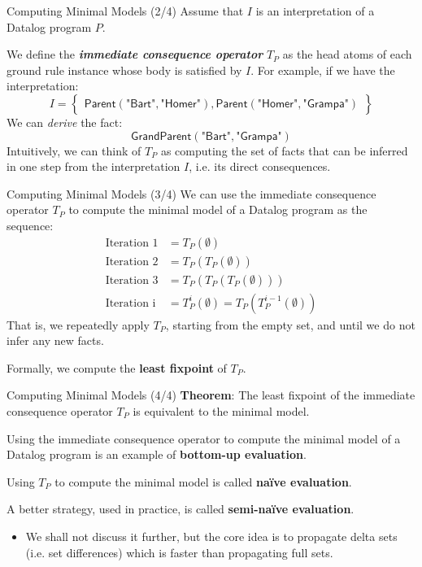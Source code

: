 \begin{frame}{Computing Minimal Models (2/4)}
Assume that $I$ is an interpretation of a Datalog program $P$.

We define the \textbf{\emph{immediate consequence operator}} $T_P$ as the head
atoms of each ground rule instance whose body is satisfied by $I$. For example, if we have the
interpretation:
$$
I = \left\{
\begin{array}{l}
\textsf{Parent}(\textsf{"Bart"}, \textsf{"Homer"}), \textsf{Parent}(\textsf{"Homer"}, \textsf{"Grampa"})
\end{array}\right\}
$$
We can \emph{derive} the fact:
$$
\textsf{GrandParent}(\textsf{"Bart"}, \textsf{"Grampa"})
$$
Intuitively, we can think of $T_P$ as computing the set of facts that can be
inferred in one step from the interpretation $I$, i.e. its direct consequences.
\end{frame}

\begin{frame}{Computing Minimal Models (3/4)}
We can use the immediate consequence operator $T_P$ to compute the minimal model
of a Datalog program as the sequence:
%
\begin{align*}
\text{Iteration 1} &= T_P(\emptyset) \\
\text{Iteration 2} &= T_P(T_P(\emptyset)) \\
\text{Iteration 3} &= T_P(T_P(T_P(\emptyset))) \\ 
\text{Iteration i} &= T_P^i(\emptyset) = T_P(T_P^{i-1}(\emptyset))
\end{align*}
%
That is, we repeatedly apply $T_P$, starting from the empty set, and until we do
not infer any new facts. 

Formally, we compute the \textbf{least fixpoint} of $T_P$.
\end{frame}

\begin{frame}{Computing Minimal Models (4/4)}
\textbf{Theorem}: The least fixpoint of the immediate consequence operator $T_P$
is equivalent to the minimal model.

\pause

Using the immediate consequence operator to compute the minimal model of a
Datalog program is an example of \textbf{bottom-up evaluation}.

\pause

Using $T_P$ to compute the minimal model is called \textbf{na\"ive
evaluation}.

\pause

A better strategy, used in practice, is called \textbf{semi-na\"ive evaluation}.
\begin{itemize}
    \item We shall not discuss it further, but the core idea is to propagate
    delta sets (i.e. set differences) which is faster than propagating full sets.
\end{itemize}
\end{frame}

